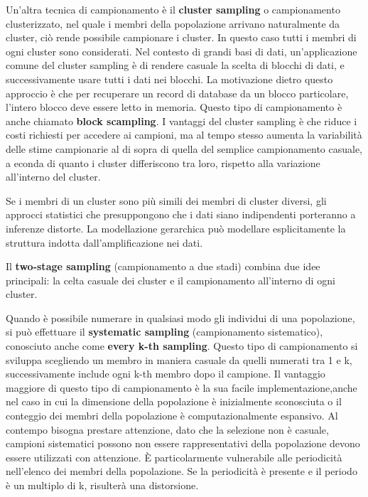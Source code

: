 \documentclass[a4paper]{extarticle}
\begin{document}
Un'altra tecnica di campionamento è il \textbf{cluster sampling} o campionamento clusterizzato, nel quale i membri della popolazione arrivano naturalmente da cluster, ciò rende possibile campionare i cluster. In questo caso tutti i membri di ogni cluster sono considerati. Nel contesto di grandi basi di dati, un'applicazione comune del cluster sampling è di rendere casuale la scelta di blocchi di dati, e successivamente usare tutti i dati nei blocchi. La motivazione dietro questo approccio è che per recuperare un record di database da un blocco particolare, l'intero blocco deve essere letto in memoria. Questo tipo di campionamento è anche chiamato \textbf{block scampling}. I vantaggi del cluster sampling è che riduce i costi richiesti per accedere ai campioni, ma al tempo stesso aumenta la variabilità delle stime campionarie al di sopra di quella del semplice campionamento casuale, a econda di quanto i cluster differiscono tra loro, rispetto alla variazione all'interno del cluster.

Se i membri di un cluster sono più simili dei membri di cluster diversi, gli approcci statistici che presuppongono che i dati siano indipendenti porteranno a inferenze distorte. La modellazione gerarchica può modellare esplicitamente la struttura indotta dall'amplificazione nei dati.

Il \textbf{two-stage sampling} (campionamento a due stadi) combina due idee principali: la celta casuale dei cluster e il campionamento all'interno di ogni cluster. 

Quando è possibile numerare in qualsiasi modo gli individui di una popolazione, si può effettuare il \textbf{systematic sampling} (campionamento sistematico), conosciuto anche come \textbf{every k-th sampling}. Questo tipo di campionamento si sviluppa scegliendo un membro in maniera casuale da quelli numerati tra 1 e k, successivamente include ogni k-th membro dopo il campione.  Il vantaggio maggiore di questo tipo di campionamento è la sua facile implementazione,anche nel caso in cui la dimensione della popolazione è inizialmente sconosciuta o il conteggio dei membri della popolazione è computazionalmente espansivo. Al contempo bisogna prestare attenzione, dato che la selezione non è casuale, campioni sistematici possono non essere rappresentativi della popolazione devono essere utilizzati con attenzione. È particolarmente vulnerabile alle periodicità nell'elenco dei membri della popolazione. Se la periodicità è presente e il periodo è un multiplo di k, risulterà una distorsione.
\end{document}
